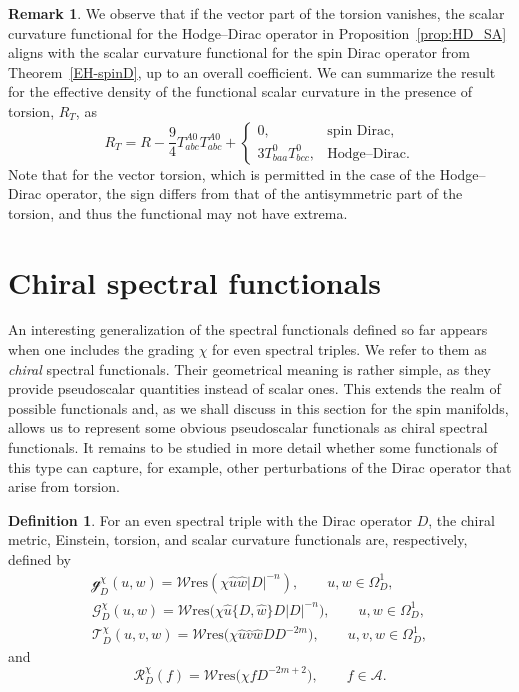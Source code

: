 \documentclass[10pt,a4paper]{amsart}
\numberwithin{equation}{section}
\theoremstyle{definition}
\newtheorem{Definition}[Theorem]{Definition}
\newtheorem{Remark}[Theorem]{Remark}
\def\W{\mathscr{W} \mathrm{res}}
\begin{document}
\begin{Remark}
 We observe that if the vector part of the torsion vanishes, the scalar curvature functional for the Hodge--Dirac operator in Proposition~\ref{prop:HD_SA} aligns with the scalar curvature functional for the spin Dirac operator from Theorem~\ref{EH-spinD}, up to an overall coefficient. We can summarize the result for the effective density of the functional scalar curvature in the presence of torsion, $R_T$, as
 \[
 R_T=R-
 \frac{9}{4}T^{A0}_{abc}T^{A0}_{abc}+\begin{cases}
 0,& \mbox{spin Dirac},\\
 3T^0_{baa}T^0_{bcc}, & \mbox{Hodge--Dirac}.
 \end{cases}
 \]
Note that for the vector torsion, which is permitted in the case of the Hodge--Dirac operator, the sign differs from that of the antisymmetric part of the torsion, and thus the functional may not have extrema.
\end{Remark}

\section{Chiral spectral functionals}
An interesting generalization of the spectral functionals defined so far appears when one includes the grading $\chi$
for even spectral triples. We refer to them as \emph{chiral} spectral functionals.
Their geometrical meaning is rather simple, as they provide
pseudoscalar quantities instead of scalar ones. This extends the realm of
possible functionals and, as we shall discuss in this section for the spin manifolds, allows us to represent some obvious pseudoscalar functionals as
chiral spectral functionals. It remains to be studied in more detail whether
some functionals of this type can capture, for example, other perturbations
of the Dirac operator that arise from torsion.
\begin{Definition}
For an even spectral triple with the Dirac operator $D$, the chiral metric, Einstein, torsion, and scalar curvature functionals are, respectively, defined by
\begin{gather*}
\mathscr{g}^\chi_D(u,w)=\W(\chi \hat{u}\hat{w}|D|^{-n}), \qquad u,w\in \Omega_D^1, \\
	\mathscr{G}_D^\chi(u,w)=\W\bigl(\chi\hat{u}\{D,\hat{w}\} D |D|^{-n}\bigr), \qquad u,w\in \Omega_D^1, \\
	\mathscr{T}_D^\chi (u,v,w)=\W\bigl(\chi\hat{u}\hat{v}\hat{w}D D^{-2m}\bigr), \qquad u,v,w\in \Omega^1_D,
\end{gather*}
and
\[
 \mathscr{R}_D^\chi(f)=\W\bigl(\chi f D^{-2m+2}\bigr), \qquad f\in \mathcal{A}.
\]
\end{Definition}
\end{document}
